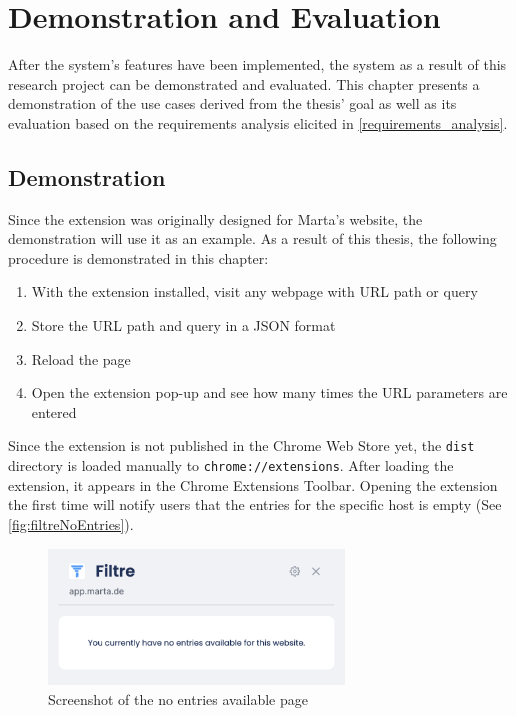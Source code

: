 \newpage
\chapter{Demonstration and Evaluation}
After the system's features have been implemented, the system as a result of this research project can be demonstrated and evaluated. This chapter presents a demonstration of the use cases derived from the thesis' goal as well as its evaluation based on the requirements analysis elicited in \autoref{requirements_analysis}.

\section{Demonstration}
Since the extension was originally designed for Marta's website, the demonstration will use it as an example. As a result of this thesis, the following procedure is demonstrated in this chapter:

\begin{enumerate}
  \item With the extension installed, visit any webpage with URL path or query
  \item Store the URL path and query in a JSON format
  \item Reload the page
  \item Open the extension pop-up and see how many times the URL parameters are entered
\end{enumerate}

Since the extension is not published in the Chrome Web Store yet, the \texttt{dist} directory is loaded manually to \verb;chrome://extensions;. After loading the extension, it appears in the Chrome Extensions Toolbar. Opening the extension the first time will notify users that the entries for the specific host is empty (See \autoref{fig:filtreNoEntries}).

\begin{figure}[H]
  \centering
  \includegraphics[width=0.7\textwidth]{assets/screenshot_filtre_no_entries.png}
  \caption{Screenshot of the no entries available page}
  \label{fig:filtreNoEntries}
\end{figure}

